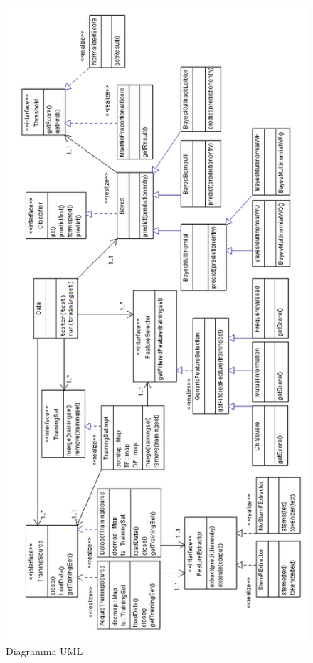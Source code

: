 \documentclass{article}
\theoremstyle{plain}
\theoremstyle{definition}
\begin{document}
\newpage
\begin{figure}[htbp]
\begin{center}
\includegraphics[scale=0.70]{img/UMLclassi.png}
\caption{Diagramma UML}
\end{center}
\end{figure}
\end{document}
